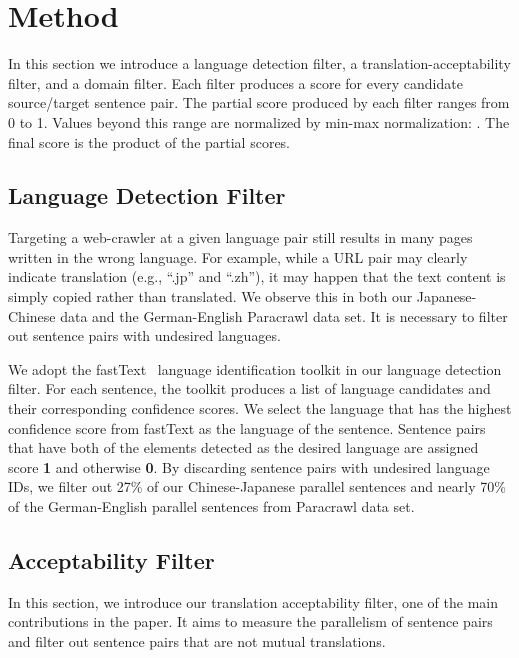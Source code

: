 \documentclass[11pt,a4paper]{article}
\begin{document}
\section{Method}

In this section we introduce a language detection filter, a translation-acceptability filter, and a domain filter. Each filter produces a score 
for every candidate source/target sentence pair. The partial score produced by each filter ranges from 0 to 1. Values beyond this range are normalized by min-max normalization: .
The final score is the product of the partial scores.


\subsection{Language Detection Filter}



Targeting a web-crawler at a given language pair still results in many pages written in the wrong language.  For example, while a URL pair may clearly indicate translation (e.g., ``.jp'' and ``.zh''), it may happen that the text content is simply copied rather than translated.  We observe this in both our Japanese-Chinese data and the German-English Paracrawl data set. It is necessary to filter out sentence pairs with undesired languages.

We adopt the fastText~\cite{joulin2016bag,joulin2016fasttext} language identification toolkit in our language detection filter. For each sentence, the toolkit produces a list of language candidates and their corresponding confidence scores. We select the language that has the highest confidence score from fastText as the language of the sentence. Sentence pairs that have both of the elements detected as the desired language are assigned score \textbf{1} and otherwise \textbf{0}. By discarding sentence pairs with undesired language IDs, we filter out 27\% of our Chinese-Japanese parallel sentences and nearly 70\% of the German-English parallel sentences from Paracrawl data set.

\subsection{Acceptability Filter}
\label{section:acceptability_filter}

In this section, we introduce our translation acceptability filter, one of the main contributions in the paper.  It aims to measure the parallelism of sentence pairs and filter out sentence pairs that are not mutual translations. 
\end{document}
